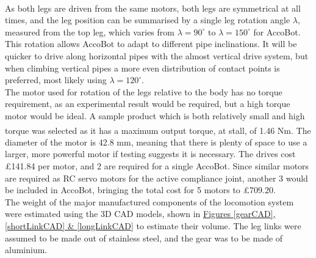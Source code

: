 \documentclass[11pt]{article}		%
\newcommand{\supercite}[1]{\textsuperscript{\cite{#1}}}		%
\begin{document}
				\\
                \hspace*{3ex}As both legs are driven from the same motors, both legs are symmetrical at all times, and the leg position can be summarised by a single leg rotation angle $\lambda$, measured from the top leg, which varies from $\lambda = 90^\circ$ to $\lambda = 150^\circ$ for AccoBot.
				This rotation allows AccoBot to adapt to different pipe inclinations.
				It will be quicker to drive along horizontal pipes with the almost vertical drive system, but when climbing vertical pipes a more even distribution of contact points is preferred, most likely using $\lambda = 120^\circ$.
				\\
                \hspace*{3ex}The motor used for rotation of the legs relative to the body has no torque requirement, as an experimental result would be required, but a high torque motor would be ideal.
				A sample product which is both relatively small and high torque was selected\supercite{rsproRotation} as it has a maximum output torque, at stall, of 1.46 Nm.
				The diameter of the motor is 42.8 mm, meaning that there is plenty of space to use a larger, more powerful motor if testing suggests it is necessary.
				The drives cost £141.84 per motor, and 2 are required for a single AccoBot.
				Since similar motors are required as RC servo motors for the active compliance joint, another 3 would be included in AccoBot, bringing the total cost for 5 motors to £709.20.
				\\
                \hspace*{3ex}The weight of the major manufactured components of the locomotion system were estimated using the 3D CAD models, shown in \hyperref[gearCAD]{Figures \ref*{gearCAD}, \ref*{shortLinkCAD} \& \ref*{longLinkCAD}} to estimate their volume.
				The leg links were assumed to be made out of stainless steel, and the gear was to be made of aluminium.
\end{document}
